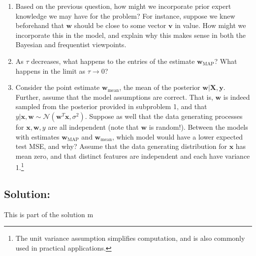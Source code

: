\documentclass[submit]{harvardml}
\begin{document}
\begin{problem}
\begin{enumerate}
        \item Based on the previous question, how might we incorporate prior expert knowledge we may have for the problem? For instance, suppose we knew beforehand that $\mathbf{w}$ should be close to some vector $\mathbf{v}$ in value. How might we incorporate this in the model, and explain why this makes sense in both the Bayesian and frequentist viewpoints.
        
        \item As $\tau$ decreases, what happens to the entries of the estimate $\mathbf{w}_{\mathrm{MAP}}$? What happens in the limit as $\tau \to 0$?
        
        \item Consider the point estimate $\mathbf{w}_{\mathrm{mean}}$, the mean of the posterior $\mathbf{w}|\mathbf{X},\mathbf{y}$. Further, assume that the model assumptions are correct. That is, $\mathbf{w}$ is indeed sampled from the posterior provided in subproblem 1, and that $y|\mathbf{x},\mathbf{w}\sim\mathcal{N}(\mathbf{w}^T\mathbf{x},\sigma^2)$. Suppose as well that the data generating processes for $\mathbf{x},\mathbf{w},y$ are all independent (note that $\mathbf{w}$ is random!). Between the models with estimates $\mathbf{w}_{\mathrm{MAP}}$ and $\mathbf{w}_{\mathrm{mean}}$, which model would have a lower expected test MSE, and why? Assume that the data generating distribution for $\mathbf{x}$ has mean zero, and that distinct features are independent and each have variance 1.\footnote{The unit variance assumption simplifies computation, and is also commonly used in practical applications.}
        
    \end{enumerate}
  
  
\end{problem}

\subsection*{Solution:}

This is part of the solution m


\newpage
\end{document}
